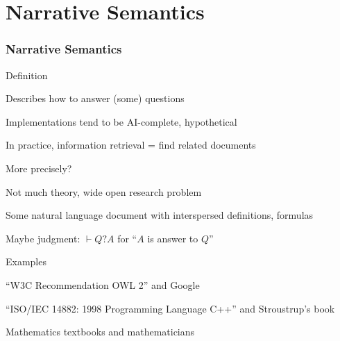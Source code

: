 \section{Narrative Semantics}

\begin{frame}\frametitle{Narrative Semantics}
\begin{blockitems}{Definition}
\item Describes how to answer (some) questions
\item Implementations tend to be AI-complete, hypothetical
\item In practice, information retrieval = find related documents
\end{blockitems}

\begin{blockitems}{More precisely?}
\item Not much theory, wide open research problem
\item Some natural language document with interspersed definitions, formulas
\item Maybe judgment: $\vdash Q ? A$ for ``$A$ is answer to $Q$''
\end{blockitems}

\begin{blockitems}{Examples}
\item ``W3C Recommendation OWL 2'' and Google
\item ``ISO/IEC 14882: 1998 Programming Language C++'' and Stroustrup's book
\item Mathematics textbooks and mathematicians
\end{blockitems}
\end{frame}

